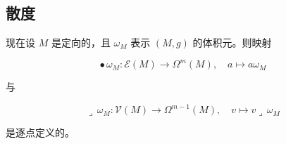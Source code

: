 \subsection*{散度}

现在设 $ M $ 是定向的，且 $ \omega_M $ 表示 $ (M,g) $ 的体积元。则映射

\begin{equation}
\bullet\,\omega_{M}: \mathcal{E}(M) \to \Omega^{m}(M), \quad a \mapsto a\omega_{M}\tag{6.7}
\end{equation}

与

\begin{equation}
\lrcorner\,\omega_{M}: \mathcal{V}(M) \to \Omega^{m-1}(M), \quad v \mapsto v\lrcorner\,\omega_{M}\tag{6.8}
\end{equation}

是逐点定义的。

